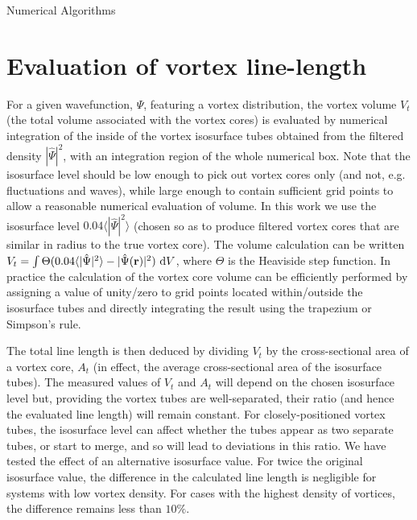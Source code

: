 \begin{chapter}{\label{cha:numerics}Numerical Algorithms}
\section{\label{section:linelength} Evaluation of vortex line-length}
For a given wavefunction, $\Psi$, featuring a vortex distribution, the vortex volume $V_t$ (the total volume associated with the vortex cores) is evaluated by numerical integration of the inside of the vortex isosurface tubes obtained from the filtered density $|\hat \Psi|^2$, with an integration region of the whole numerical box.  Note that the isosurface level should be low enough to pick out vortex cores only (and not, e.g. fluctuations and waves), while large enough to contain sufficient grid points to allow a reasonable numerical evaluation of volume. In this work we use the isosurface level $0.04\langle |\hat{\Psi}|^2 \rangle$ (chosen so as to produce filtered vortex cores that are similar in radius to the true vortex core).  The volume calculation can be written $V_t = \int \Theta(0.04\langle |\hat{\Psi}|^2 \rangle - |\hat{\Psi}({\bf r})|^2)~{\rm d}V$, where $\Theta$ is the Heaviside step function. In practice the calculation of the vortex core volume can be efficiently performed by assigning a value of unity/zero to grid points located within/outside the isosurface tubes and directly integrating the result using the trapezium or Simpson's rule.

The total line length is then deduced by dividing $V_t$ by the cross-sectional area of a vortex core, $A_t$ (in effect, the average cross-sectional area of the isosurface tubes). The measured values of $V_t$ and $A_t$ will depend on the chosen isosurface level but, providing the vortex tubes are well-separated, their ratio (and hence the evaluated line length) will remain constant.  For closely-positioned vortex tubes, the isosurface level can affect whether the tubes appear as two separate tubes, or start to merge, and so will lead to deviations in this ratio.  We have tested the effect of an alternative isosurface value.  For twice the original isosurface value, the difference in the calculated line length is negligible for systems with low vortex density.  For cases with the highest density of vortices, the difference remains less than $10\%$.

\end{chapter}
